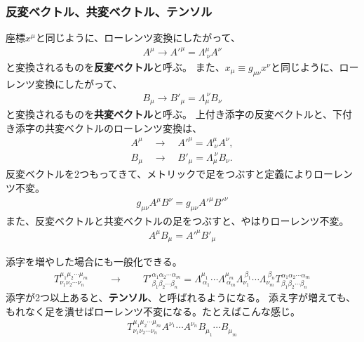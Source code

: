 \documentclass[10pt,a4paper]{jarticle}
\begin{document}
\subsubsection{反変ベクトル、共変ベクトル、テンソル}
座標$x^\mu$と同じように、ローレンツ変換にしたがって、
\begin{align}
A^\mu \to {A'}^\mu = \Lambda^\mu_{~\nu} A^\nu \label{eq:hanpen vector}
\end{align}
と変換されるものを\textbf{反変ベクトル}と呼ぶ。
また、$x_\mu \equiv g_{\mu\nu} x^\nu$と同じように、ローレンツ変換にしたがって、
\begin{align}
B_\mu \to {B'}_\mu = \Lambda_\mu^{~\nu} B_\nu \label{eq:kyohen vector}
\end{align}
と変換されるものを\textbf{共変ベクトル}と呼ぶ。
%
上付き添字の反変ベクトルと、下付き添字の共変ベクトルのローレンツ変換は、
\begin{align}
A^\mu \quad\to\quad {A'}^\mu = \Lambda^\mu_{~\nu} A^\nu, \\
B_\mu \quad\to\quad {B'}_\mu = \Lambda_\mu^{~\nu} B_\nu.
\end{align}
%
反変ベクトルを2つもってきて、メトリックで足をつぶすと定義によりローレンツ不変。
\begin{align}
g_{\mu\nu} A^\mu B^\nu = g_{\mu\nu} {A'}^\mu {B'}^\nu
\end{align}
また、反変ベクトルと共変ベクトルの足をつぶすと、やはりローレンツ不変。
\begin{align}
A^\mu B_\mu = {A'}^\mu {B'}_\mu
\end{align}

添字を増やした場合にも一般化できる。
\begin{align}
T^{\mu_1 \mu_2 \cdots \mu_m}_{\nu_1 \nu_2 \cdots \nu_n}
\qquad\to\qquad
{T'}^{\alpha_1 \alpha_2 \cdots \alpha_m}_{\beta_1 \beta_2 \cdots \beta_n}
=
\Lambda^{\mu_1}_{~\alpha_1}
\cdots
\Lambda^{\mu_m}_{~\alpha_m}
\Lambda_{\nu_1}^{~\beta_1}
\cdots
\Lambda_{\nu_m}^{~\beta_n}
{T}^{\alpha_1 \alpha_2 \cdots \alpha_m}_{\beta_1 \beta_2 \cdots \beta_n}
\end{align}
添字が2つ以上あると、\textbf{テンソル}、と呼ばれるようになる。
添え字が増えても、もれなく足を潰せばローレンツ不変になる。たとえばこんな感じ。
\begin{align}
T^{\mu_1 \mu_2 \cdots \mu_m}_{\nu_1 \nu_2 \cdots \nu_n}
A^{\nu_1} \cdots A^{\nu_n} B_{\mu_1} \cdots B_{\mu_m}
\end{align}
\end{document}
